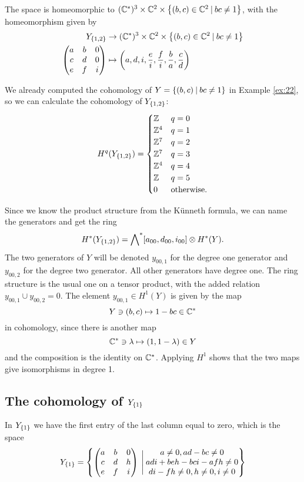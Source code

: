 The space is homeomorphic to $(\mathbb{C}^*)^3\times \mathbb{C}^2
\times \left\{ (b,c)\in\mathbb{C}^2 \: \vert \: bc\neq 1 \right\}$, with the
homeomorphism given by
\begin{align*}
  Y_{\left\{ 1,2 \right\}} &\to (\mathbb{C}^*)^3\times \mathbb{C}^2
  \times \left\{ (b,c)\in\mathbb{C}^2 \: \vert \: bc\neq 1 \right\} \\
  \begin{pmatrix}
    a & b & 0 \\
    c & d & 0 \\
    e & f & i
  \end{pmatrix} &\mapsto \left(a,d,i,\frac{e}{i},\frac{f}{i},
    \frac{b}{a}, \frac{c}{d}\right)
\end{align*}

We already computed the cohomology of $Y =\left\{ (b,c)\: \vert\:
  bc\neq 1 \right\}$ in Example \ref{ex:22}, so we can calculate the
cohomology of $Y_{\left\{ 1,2 \right\}}$:
\[ H^q(Y_{\left\{ 1,2 \right\}}) =
\begin{cases}
  \mathbb{Z} & q = 0 \\
  \mathbb{Z}^4 & q = 1 \\
  \mathbb{Z}^7 & q = 2 \\
  \mathbb{Z}^7 & q = 3 \\
  \mathbb{Z}^4 & q = 4 \\
  \mathbb{Z} & q = 5 \\
  0 & \text{otherwise}.
\end{cases} \]

Since we know the product structure from the K\"unneth formula, we can
name the generators and get the ring 
\[ H^*(Y_{\left\{ 1,2 \right\}}) = \bigwedge\nolimits^*[a_{00},d_{00},i_{00}]\otimes
H^*(Y). \]
The two generators of $Y$ will be denoted $y_{00,1}$ for the degree
one generator and $y_{00,2}$ for the degree two generator. All other
generators have degree one. The ring
structure is the usual one on a tensor product, with the added
relation $y_{00,1}\cup y_{00,2} = 0$. The element $y_{00,1}\in H^1(Y)$
is given by the map
\[ Y\ni (b,c) \mapsto 1-bc\in \mathbb{C}^* \]
in cohomology, since there is another map
\[ \mathbb{C}^* \ni \lambda \mapsto (1,1-\lambda) \in Y \]
and the composition is the identity on $\mathbb{C}^*$. Applying $H^1$ shows
that the two maps give isomorphisms in degree 1.


\subsection{The cohomology of $Y_{\left\{ 1 \right\}}$}

In $Y_{\left\{ 1 \right\}}$ we have the first entry of the last column equal to
zero, which is the space
\[ Y_{\left\{ 1 \right\}} = \left\{ 
  \begin{pmatrix}
    a & b & 0 \\
    c & d & h \\
    e & f & i
  \end{pmatrix} \:\Bigg\vert\:
  \begin{matrix}
    a \neq 0, ad-bc \neq 0 \\
    adi + beh - bci - afh \neq 0 \\
    di -fh \neq 0, h \neq 0, i \neq 0 
  \end{matrix}
 \right\} \]


